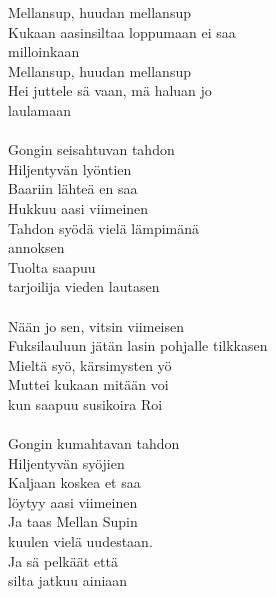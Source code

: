 
Mellansup, huudan mellansup \\ Kukaan aasinsiltaa loppumaan ei saa \\ milloinkaan \\ Mellansup, huudan mellansup \\ Hei juttele sä vaan, mä haluan jo \\ laulamaan \\ \hspace{10mm} \\ Gongin seisahtuvan tahdon \\ Hiljentyvän lyöntien \\ Baariin lähteä en saa \\ Hukkuu aasi viimeinen \\ Tahdon syödä vielä lämpimänä \\ annoksen \\ Tuolta saapuu \\ tarjoilija vieden lautasen \\ \hspace{10mm} \\ Nään jo sen, vitsin viimeisen \\ Fuksilauluun jätän lasin pohjalle tilkkasen \\ Mieltä syö, kärsimysten yö \\ Muttei kukaan mitään voi \\ kun saapuu susikoira Roi \\ \hspace{10mm} \\ Gongin kumahtavan tahdon \\ Hiljentyvän syöjien \\ Kaljaan koskea et saa \\ löytyy aasi viimeinen \\ Ja taas Mellan Supin \\ kuulen vielä uudestaan. \\ Ja sä pelkäät että \\ silta jatkuu ainiaan